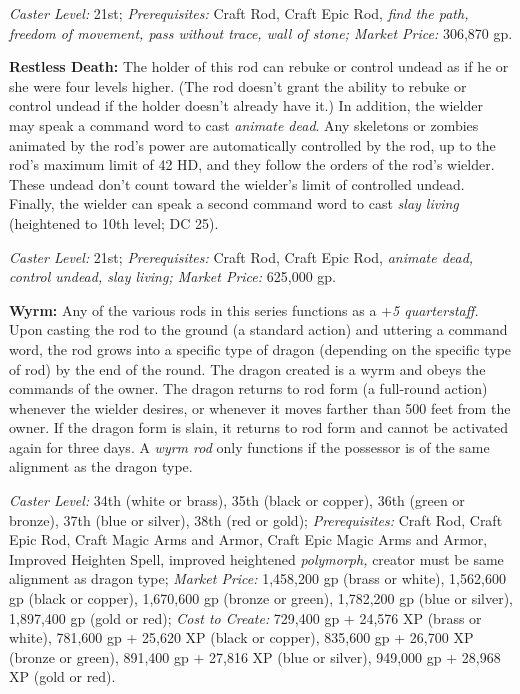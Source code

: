\documentclass{article}
\begin{document}
\textit{Caster Level: }21st; \textit{Prerequisites: }Craft Rod, Craft Epic Rod, 
\textit{find the path, freedom of movement, pass without trace, wall of stone; 
Market Price: }306,870 gp. 

\textbf{Restless Death: }The holder of this rod can rebuke or control undead as 
if he or she were four levels higher. (The rod doesn't grant the ability to rebuke 
or control undead if the holder doesn't already have it.) In addition, the wielder 
may speak a command word to cast \textit{animate dead}. Any skeletons or zombies 
animated by the rod's power are automatically controlled by the rod, up to the 
rod's maximum limit of 42 HD, and they follow the orders of the rod's wielder. 
These undead don't count toward the wielder's limit of controlled undead. Finally, 
the wielder can speak a second command word to cast \textit{slay living }(heightened 
to 10th level; DC 25). 

\textit{Caster Level: }21st; \textit{Prerequisites: }Craft Rod, Craft Epic Rod, 
\textit{animate dead, control undead, slay living; Market Price: }625,000 gp. 

\textbf{Wyrm: }Any of the various rods in this series functions as a +\textit{5 
quarterstaff. }Upon casting the rod to the ground (a standard action) and uttering 
a command word, the rod grows into a specific type of dragon (depending on the 
specific type of rod) by the end of the round. The dragon created is a wyrm and 
obeys the commands of the owner. The dragon returns to rod form (a full-round action) 
whenever the wielder desires, or whenever it moves farther than 500 feet from the 
owner. If the dragon form is slain, it returns to rod form and cannot be activated 
again for three days. A \textit{wyrm rod }only functions if the possessor is of 
the same alignment as the dragon type. 

\textit{Caster Level: }34th (white or brass), 35th (black or copper), 36th (green 
or bronze), 37th (blue or silver), 38th (red or gold); \textit{Prerequisites: }Craft 
Rod, Craft Epic Rod, Craft Magic Arms and Armor, Craft Epic Magic Arms and Armor, 
Improved Heighten Spell, improved heightened \textit{polymorph, }creator must be 
same alignment as dragon type; \textit{Market Price: }1,458,200 gp (brass or white), 
1,562,600 gp (black or copper), 1,670,600 gp (bronze or green), 1,782,200 gp (blue 
or silver), 1,897,400 gp (gold or red); \textit{Cost to Create: }729,400 gp + 24,576 
XP (brass or white), 781,600 gp + 25,620 XP (black or copper), 835,600 gp + 26,700 
XP (bronze or green), 891,400 gp + 27,816 XP (blue or silver), 949,000 gp + 28,968 
XP (gold or red). 

\newpage
\end{document}
